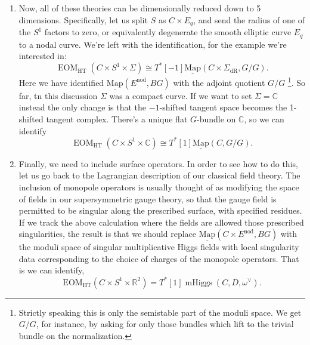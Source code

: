 \documentclass[11pt, oneside, reqno]{amsart}
\theoremstyle{definition} \newtheorem{definition}{Definition}[section]
\theoremstyle{definition} \newtheorem{remark}[definition]{Remark}
\theoremstyle{definition} \newtheorem{remarks}[definition]{Remarks}
\theoremstyle{definition} \newtheorem{question}[definition]{Question}
\theoremstyle{definition} \newtheorem*{note}{Note}
\theoremstyle{definition} \newtheorem{example}[definition]{Example}
\theoremstyle{definition} \newtheorem{examples}[definition]{Examples}
\newcommand{\mr}[1]{\mathrm{#1}}
\newcommand{\ul}[1]{\underline{#1}}
\newcommand{\CC}{\mathbb{C}}
\newcommand{\RR}{\mathbb{R}}
\newcommand{\iso}{\cong}
\DeclareMathOperator{\EOM}{EOM}
\DeclareMathOperator{\mhiggs}{mHiggs}
\newcommand{\map}{\ul{\mr{Map}}}
\newcommand{\HT}{\mr{HT}}
\begin{document}
\begin{enumerate}
 \item Now, all of these theories can be dimensionally reduced down to 5 dimensions.  Specifically, let us split $S$ as $C \times E_q$, and send the radius of one of the $S^1$ factors to zero, or equivalently degenerate the smooth elliptic curve $E_q$ to a nodal curve.  We're left with the identification, for the example we're interested in:
 \[\EOM_\HT(C \times S^1 \times \Sigma) \iso T^*[-1]\map(C \times \Sigma_{\mr{dR}}, G/G).\]
 Here we have identified $\map(E^{\mr{nod}}, BG)$ with the adjoint quotient $G/G$ \footnote{Strictly speaking this is only the semistable part of the moduli space.  We get $G/G$, for instance, by asking for only those bundles which lift to the trivial bundle on the normalization.}.  So far, tn this discussion $\Sigma$ was a compact curve.  If we want to set $\Sigma = \CC$ instead the only change is that the $-1$-shifted tangent space becomes the 1-shifted tangent complex.  There's a unique flat $G$-bundle on $\CC$, so we can identify
 \[\EOM_\HT(C \times S^1 \times \CC) \iso T^*[1]\map(C, G/G).\]
 
 \item Finally, we need to include surface operators.  In order to see how to do this, let us go back to the Lagrangian description of our classical field theory.  The inclusion of monopole operators is usually thought of as modifying the space of fields in our supersymmetric gauge theory, so that the gauge field is permitted to be singular along the prescribed surface, with specified residues.  If we track the above calculation where the fields are allowed those prescribed singularities, the result is that we should replace $\map(C \times E^{\mr{nod}}, BG)$ with the moduli space of singular multiplicative Higgs fields with local singularity data corresponding to the choice of charges of the monopole operators.  That is we can identify,
 \[\mr{EOM}_\HT(C \times S^1 \times \RR^2) = T^*[1]\mhiggs(C,D,\omega^\vee).\]
\end{enumerate}
\end{document}
